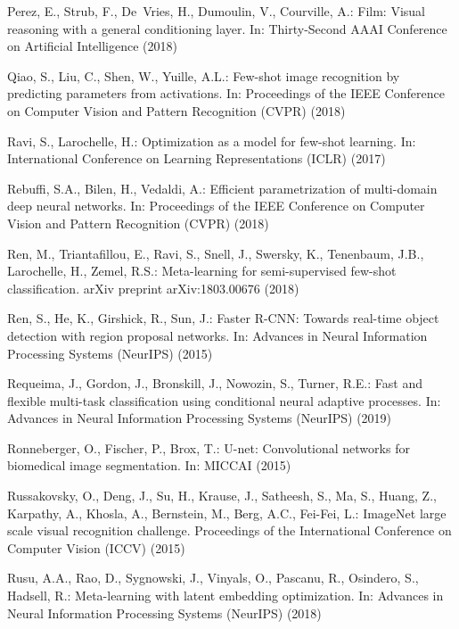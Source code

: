 \documentclass[runningheads]{llncs}
\begin{document}
\begin{thebibliography}{10}
Perez, E., Strub, F., De~Vries, H., Dumoulin, V., Courville, A.: Film: Visual
  reasoning with a general conditioning layer. In: Thirty-Second AAAI
  Conference on Artificial Intelligence (2018)

Qiao, S., Liu, C., Shen, W., Yuille, A.L.: Few-shot image recognition by
  predicting parameters from activations. In: Proceedings of the IEEE
  Conference on Computer Vision and Pattern Recognition (CVPR) (2018)

Ravi, S., Larochelle, H.: Optimization as a model for few-shot learning. In:
  International Conference on Learning Representations (ICLR) (2017)

Rebuffi, S.A., Bilen, H., Vedaldi, A.: Efficient parametrization of
  multi-domain deep neural networks. In: Proceedings of the IEEE Conference on
  Computer Vision and Pattern Recognition (CVPR) (2018)

Ren, M., Triantafillou, E., Ravi, S., Snell, J., Swersky, K., Tenenbaum, J.B.,
  Larochelle, H., Zemel, R.S.: Meta-learning for semi-supervised few-shot
  classification. arXiv preprint arXiv:1803.00676  (2018)

Ren, S., He, K., Girshick, R., Sun, J.: Faster {R-CNN}: Towards real-time
  object detection with region proposal networks. In: Advances in Neural
  Information Processing Systems (NeurIPS) (2015)

Requeima, J., Gordon, J., Bronskill, J., Nowozin, S., Turner, R.E.: Fast and
  flexible multi-task classification using conditional neural adaptive
  processes. In: Advances in Neural Information Processing Systems (NeurIPS)
  (2019)

Ronneberger, O., Fischer, P., Brox, T.: U-net: Convolutional networks for
  biomedical image segmentation. In: MICCAI (2015)

Russakovsky, O., Deng, J., Su, H., Krause, J., Satheesh, S., Ma, S., Huang, Z.,
  Karpathy, A., Khosla, A., Bernstein, M., Berg, A.C., Fei-Fei, L.: {ImageNet
  large scale visual recognition challenge}. Proceedings of the International
  Conference on Computer Vision (ICCV)  (2015)

Rusu, A.A., Rao, D., Sygnowski, J., Vinyals, O., Pascanu, R., Osindero, S.,
  Hadsell, R.: Meta-learning with latent embedding optimization. In: Advances
  in Neural Information Processing Systems (NeurIPS) (2018)


\end{thebibliography}
\end{document}
